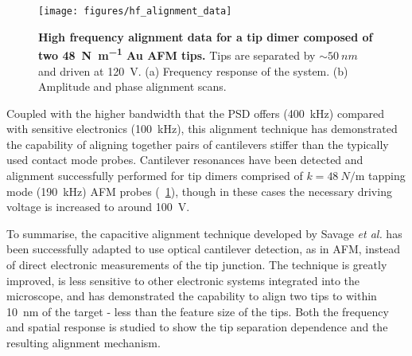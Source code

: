 \documentclass{article}
\begin{document}
\begin{figure}[h]
\centering
\texttt{[image: figures/hf\_alignment\_data]}
\caption[High frequency alignment data for a tip dimer composed of two \SI{48}{N\per\metre} Au AFM tips]{\textbf{High frequency alignment data for a tip dimer composed of two \SI{48}{N\per\metre} Au AFM tips.} Tips are separated by $\sim\SI{50}{nm}$ and driven at \SI{120}{V}. (a) Frequency response of the system. (b) Amplitude and phase alignment scans.}
\label{fig:hf_alignment_data} 
\end{figure}

Coupled with the higher bandwidth that the PSD offers (\SI{400}{kHz}) compared with sensitive electronics (\SI{100}{kHz}), this alignment technique has demonstrated the capability of aligning together pairs of cantilevers stiffer than the typically used contact mode probes. Cantilever resonances have been detected and alignment successfully performed for tip dimers comprised of $k=\SI{48}{N\per\metre}$ tapping mode (\SI{190}{kHz}) AFM probes (\figurename~\ref{fig:hf_alignment_data}), though in these cases the necessary driving voltage is increased to around \SI{100}{V}.

To summarise, the capacitive alignment technique developed by Savage \textit{et al.} \cite{savage2011} has been successfully adapted to use optical cantilever detection, as in AFM, instead of direct electronic measurements of the tip junction. The technique is greatly improved, is less sensitive to other electronic systems integrated into the microscope, and has demonstrated the capability to align two tips to within \SI{10}{nm} of the target - less than the feature size of the tips. Both the frequency and spatial response is studied to show the tip separation dependence and the resulting alignment mechanism.
\end{document}
